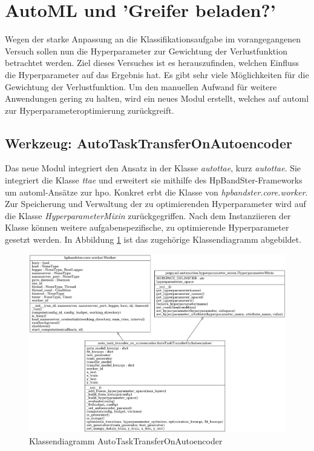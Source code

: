 	\section{AutoML und 'Greifer beladen?'}
	\label{sec:Transfer_autoMl}
	Wegen der starke Anpassung an die Klassifikationsaufgabe im vorangegangenen Versuch sollen nun die Hyperparameter zur Gewichtung der Verlustfunktion betrachtet werden. Ziel dieses Versuches ist es herauszufinden, welchen Einfluss die Hyperparameter auf das Ergebnis hat. Es gibt sehr viele Möglichkeiten für die Gewichtung der Verlustfunktion. Um den manuellen Aufwand für weitere Anwendungen gering zu halten, wird ein neues Modul erstellt, welches auf \ac{automl} zur Hyperparameteroptimierung zurückgreift.
	
	\subsection{Werkzeug: AutoTaskTransferOnAutoencoder}
	\label{subsec:AutoTaskTransferOnAutoencoder}
	Das neue Modul integriert den Ansatz in der Klasse \textit{\acl{autottae}}, kurz \textit{\ac{autottae}}. Sie integriert die Klasse \textit{\acl{ttae}} und erweitert sie mithilfe des HpBandSter-Frameworks um \ac{automl}-Ansätze zur \ac{hpo}. Konkret erbt die Klasse von \textit{hpbandster.core.worker}. Zur Speicherung und Verwaltung der zu optimierenden Hyperparameter wird auf die Klasse \textit{HyperparameterMixin} zurückgegriffen. Nach dem Instanziieren der Klasse können weitere aufgabenspezifische, zu optimierende Hyperparameter gesetzt werden. In Abbildung \ref{img:KlassendiagrammAutoTaskTransferOnAutoencoder}  ist das zugehörige Klassendiagramm abgebildet. 
	\begin{figure}[h]
		\centering
		\includegraphics[width=1\textwidth, center]{bilder/Klassendiagramme/AutoTTAE.png}
		\caption[Klassendiagramm AutoTaskTransferOnAutoencoder]{Klassendiagramm AutoTaskTransferOnAutoencoder}
		\label{img:KlassendiagrammAutoTaskTransferOnAutoencoder}
	\end{figure}  

